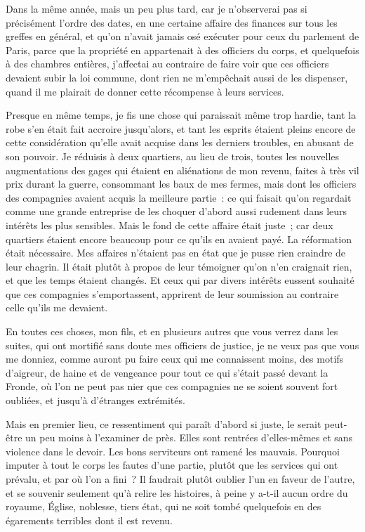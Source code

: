 \documentclass[french,twoside]{book} %
\begin{document}
Dans la même année, mais un peu plus tard, car je n’observerai pas si précisément l’ordre des dates, en une certaine affaire des finances sur tous les greffes en général, et qu’on n’avait jamais osé exécuter pour ceux du parlement de Paris, parce que la propriété en appartenait à des officiers du corps, et quelquefois à des chambres entières, j’affectai au contraire de faire voir que ces officiers devaient subir la loi commune, dont rien ne m’empêchait aussi de les dispenser, quand il me plairait de donner cette récompense à leurs services.\par
Presque en même temps, je fis une chose qui paraissait même trop hardie, tant la robe s’en était fait accroire jusqu’alors, et tant les esprits étaient pleins encore de cette considération qu’elle avait acquise dans les derniers troubles, en abusant de son pouvoir. Je réduisis à deux quartiers, au lieu de trois, toutes les nouvelles augmentations des gages qui étaient en aliénations de mon revenu, faites à très vil prix durant la guerre, consommant les baux de mes fermes, mais dont les officiers des compagnies avaient acquis la meilleure partie : ce qui faisait qu’on regardait comme une grande entreprise de les choquer d’abord aussi rudement dans leurs intérêts les plus sensibles. Mais le fond de cette affaire était juste ; car deux quartiers étaient encore beaucoup pour ce qu’ils en avaient payé. La réformation était nécessaire. Mes affaires n’étaient pas en état que je pusse rien craindre de leur chagrin. Il était plutôt à propos de leur témoigner qu’on n’en craignait rien, et que les temps étaient changés. Et ceux qui par divers intérêts eussent souhaité que ces compagnies s’emportassent, apprirent de leur soumission au contraire celle qu’ils me devaient.\par
En toutes ces choses, mon fils, et en plusieurs autres que vous verrez dans les suites, qui ont mortifié sans doute mes officiers de justice, je ne veux pas que vous me donniez, comme auront pu faire ceux qui me connaissent moins, des motifs d’aigreur, de haine et de vengeance pour tout ce qui s’était passé devant la Fronde, où l’on ne peut pas nier que ces compagnies ne se soient souvent fort oubliées, et jusqu’à d’étranges extrémités.\par
Mais en premier lieu, ce ressentiment qui paraît d’abord si juste, le serait peut-être un peu moins à l’examiner de près. Elles sont rentrées d’elles-mêmes et sans violence dans le devoir. Les bons serviteurs ont ramené les mauvais. Pourquoi imputer à tout le corps les fautes d’une partie, plutôt que les services qui ont prévalu, et par où l’on a fini ? Il faudrait plutôt oublier l’un en faveur de l’autre, et se souvenir seulement qu’à relire les histoires, à peine y a-t-il aucun ordre du royaume, Église, noblesse, tiers état, qui ne soit tombé quelquefois en des égarements terribles dont il est revenu.\par
\end{document}

